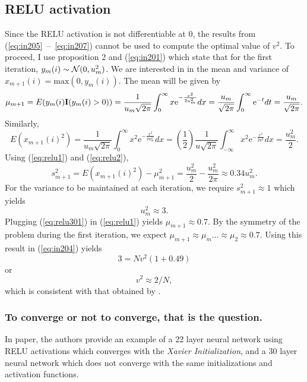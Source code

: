 \documentclass[a4paper]{article}
\newcommand{\enum}[1]{\label{eq:#1}}
\newcommand{\eref}[1]{(\ref {eq:#1})}
\newcommand{\be}{\begin{equation}}
\newcommand{\ee}{\end{equation}}
\newcommand{\erefs}[2]{({\ref{eq:#1}}~--~{\ref{eq:#2}})}
\begin{document}
\subsection{RELU activation}

Since the RELU activation is not differentiable at 0, the results from \erefs{in205}{in207} cannot be used to compute the optimal value of $v^{2}$. To proceed, I use proposition 2 and \eref{in201} which state that for the first iteration, $ y_{m}(i) \sim {\cal{N}}(0,u_{m}^{2})$. We are interested in in the mean and variance of $x_{m+1}(i) = \mbox{max}(0,y_{m}(i))$. The mean will be given by
\be 
 \mu_{m+1} = E(y_{m}(i){\bf{I}}(y_{m}(i)>0)) = \frac{1}{{u_{m}\sqrt{2\pi}}}\int_{0}^{\infty} x \mbox{e}^{-\frac{x^{2}}{2u_{m}^{2}}}dx = \frac{u_{m}}{\sqrt{2\pi}}\int_{0}^{\infty}\mbox{e}^{-t}dt = \frac{u_{m}}{\sqrt{2\pi}}. \enum{relu1}
\ee 
Similarly,
\be 
E(x_{m+1}(i)^{2}) =  \frac{1}{{u_{m}\sqrt{2\pi}}}\int_{0}^{\infty} x^{2} \mbox{e}^{-\frac{x^{2}}{2u_{m}^{2}}}dx = \left(\frac{1}{2}\right) \frac{1}{{u\sqrt{2\pi}}} \int_{-\infty}^{\infty} x^{2} \mbox{e}^{-\frac{x^{2}}{2u^{2}}}dx = \frac{u_{m}^{2}}{2}. \enum{relu2}
\ee 
Using \eref{relu1} and \eref{relu2},
\be
s_{m+1}^{2} = E(x_{m+1}(i)^{2}) - \mu_{m+1}^{2} = \frac{u_{m}^{2}}{2} - \frac{u_{m}^{2}}{2\pi} \approx 0.34u_{m}^{2}. \enum{relu3}
\ee 
For the variance to be maintained at each iteration, we require $s_{m+1}^{2}  \approx 1$ which yields 
\be 
u_{m}^{2} \approx 3. \enum{relu301}
\ee 
Plugging \eref{relu301} in \eref{relu1} yields $\mu_{m+1} \approx 0.7$. By the symmetry of the problem during the first iteration, we expect $\mu_{m+1} \approx \mu_{m} ... \approx \mu_{2} \approx 0.7$. 
Using this result in \eref{in204} yields
\be 
3 = Nv^{2}(1+ 0.49) 
\ee 
or 
\be 
v^{2}\approx 2/N,
\ee 
which is consistent with that obtained by \cite{he2015delving}.
\subsubsection*{To converge or not to converge, that is the question.}

In \cite{he2015delving} paper, the authors provide an example of a 22 layer neural network using RELU activations which converges with the {\it{Xavier Initialization}}, and a 30 layer neural network which does not converge with the same initializations and activation functions. 
\end{document}
